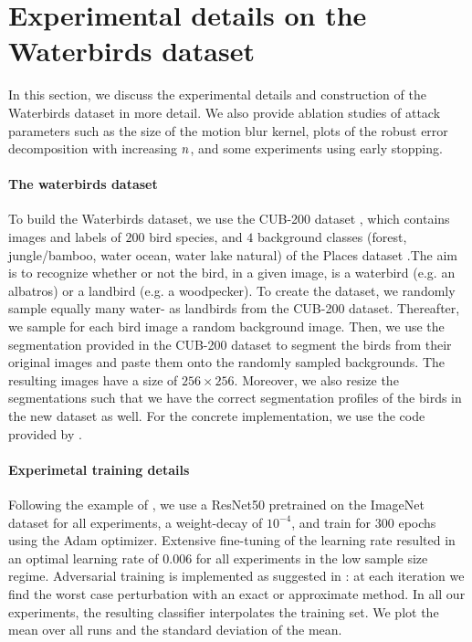 \section{Experimental details on the Waterbirds dataset}
\label{sec:waterbirds}
In this section, we discuss the experimental details and construction of the Waterbirds dataset in more detail. We also provide ablation studies of attack parameters such as the size of the motion blur kernel, plots of the robust error decomposition with increasing $n$, and some experiments using early stopping.

\paragraph{The waterbirds dataset}

To build the Waterbirds dataset, we use the CUB-200 dataset \cite{Welinder10}, which contains images and labels of $200$ bird species, and $4$ background classes (forest, jungle/bamboo, water ocean, water lake natural) of the Places dataset \cite{zhou17}.The aim is to recognize whether or not the bird, in a given image, is a waterbird (e.g. an albatros) or a landbird (e.g. a woodpecker). To create the dataset, we randomly sample equally many water- as landbirds from the CUB-200 dataset. Thereafter, we sample for each bird image a random background image. Then, we use the segmentation provided in the CUB-200 dataset to segment the birds from their original images and paste them onto the randomly sampled backgrounds. The resulting images have a size of $256 \times 256$. Moreover, we also resize the segmentations such that we have the correct segmentation profiles of the birds in the new dataset as well. For the concrete implementation, we use the code provided by \cite{Sagawa20}.

\paragraph{Experimetal training details}
Following the example of \cite{Sagawa20}, we use a ResNet50 pretrained on the ImageNet dataset for all experiments, a weight-decay of $10^{-4}$, and train for $300$ epochs using the Adam optimizer. Extensive fine-tuning of the learning rate resulted in an optimal learning rate of $0.006$ for all experiments in the low sample size regime. Adversarial training is implemented as suggested in \cite{madry18}: at each iteration we find the worst case perturbation with an exact or approximate method. In all our experiments, the resulting classifier interpolates the training set. We plot the mean over all runs and the standard deviation of the mean. 

